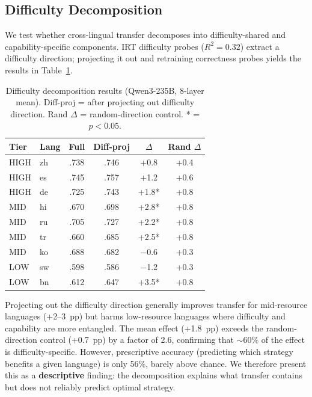 \documentclass[11pt,a4paper]{article}
\begin{document}
\subsection{Difficulty Decomposition}
\label{sec:decomposition}

We test whether cross-lingual transfer decomposes into difficulty-shared and capability-specific components. IRT difficulty probes ($R^2 = 0.32$) extract a difficulty direction; projecting it out and retraining correctness probes yields the results in Table~\ref{tab:decomp}.

\begin{table}[t]
\centering
\small
\setlength{\tabcolsep}{3pt}
\begin{tabular}{llcccc}
\toprule
\textbf{Tier} & \textbf{Lang} & \textbf{Full} & \textbf{Diff-proj} & \textbf{$\Delta$} & \textbf{Rand $\Delta$} \\
\midrule
HIGH & zh & .738 & .746 & +0.8 & +0.4 \\
HIGH & es & .745 & .757 & +1.2 & +0.6 \\
HIGH & de & .725 & .743 & +1.8* & +0.8 \\
MID  & hi & .670 & .698 & +2.8* & +0.8 \\
MID  & ru & .705 & .727 & +2.2* & +0.8 \\
MID  & tr & .660 & .685 & +2.5* & +0.8 \\
MID  & ko & .688 & .682 & $-$0.6 & +0.3 \\
LOW  & sw & .598 & .586 & $-$1.2 & +0.3 \\
LOW  & bn & .612 & .647 & +3.5* & +0.8 \\
\bottomrule
\end{tabular}
\caption{Difficulty decomposition results (Qwen3-235B, 8-layer mean). Diff-proj = after projecting out difficulty direction. Rand $\Delta$ = random-direction control. * = $p<0.05$.}
\label{tab:decomp}
\end{table}

Projecting out the difficulty direction generally improves transfer for mid-resource languages (+2--3~pp) but harms low-resource languages where difficulty and capability are more entangled. The mean effect (+1.8~pp) exceeds the random-direction control (+0.7~pp) by a factor of 2.6, confirming that ${\sim}60\%$ of the effect is difficulty-specific. However, prescriptive accuracy (predicting which strategy benefits a given language) is only 56\%, barely above chance. We therefore present this as a \textbf{descriptive} finding: the decomposition explains what transfer contains but does not reliably predict optimal strategy.
\end{document}
